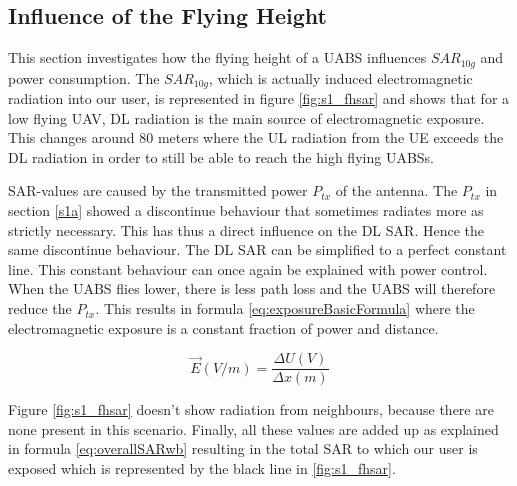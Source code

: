 \FloatBarrier
\subsection{Influence of the Flying Height}
\label{sub:senario1_influenceOfFlyHeight}

This section investigates how the flying height of a \gls{UABS} influences $SAR_{10g}$ and power consumption.
The $SAR_{10g}$, which is actually induced electromagnetic radiation into our user, is represented in figure \ref{fig:s1_fhsar}
and shows that for a low flying \gls{UAV}, \gls{DL} radiation is the main source of electromagnetic exposure.
This changes around 80 meters where the \gls{UL} radiation from the \gls{UE}
exceeds the \gls{DL} radiation in order to still be able to reach the high flying \gls{UABS}s.

\gls{SAR}-values are caused by the transmitted power  $P_{tx}$ of the antenna. The $P_{tx}$ in section \ref{s1a}
showed a discontinue behaviour that sometimes radiates more as strictly necessary. This has thus a direct influence
on the \gls{DL} \gls{SAR}. Hence the same discontinue behaviour. The \gls{DL} \gls{SAR} can be simplified to a perfect constant line.
This constant behaviour can once again be explained with power control. When the \gls{UABS} flies lower, there is less path loss and the \gls{UABS} 
will therefore reduce the $P_{tx}$. This results in formula \ref{eq:exposureBasicFormula} where the electromagnetic exposure is a constant fraction of power and distance.

\begin{equation}
\vec{E} (V/m) = \frac{\Delta U (V) }{\Delta x (m)}
\label{eq:exposureBasicFormula}
\end{equation}


Figure \ref{fig:s1_fhsar} doesn't show radiation from neighbours, because there are none present in this scenario. 
Finally, all these values are added up as explained in formula \ref{eq:overallSARwb} resulting in the total \gls{SAR}
to which our user is exposed which is represented by the black line in \ref{fig:s1_fhsar}.

